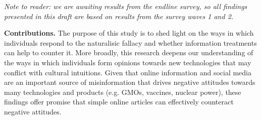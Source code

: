 \documentclass[12pt]{article}
\newcommand{\todo}[1]{\textit{\textcolor{red}{$<$todo$>$ #1 $<$/todo$>$}}}
\begin{document}
\textit{Note to reader: we are awaiting results from the endline survey, so all findings presented in this draft are based on results from the survey waves 1 and 2.}






\textbf{Contributions.} The purpose of this study is to shed light on the ways in which individuals respond to the naturalisic fallacy and whether information treatments can help to counter it. More broadly, this research deepens our understanding of the ways in which individuals form opinions towards new technologies that may conflict with cultural intuitions. Given that online information and social media are an important source of misinformation that drives negative attitudes towards many technologies and products (e.g. GMOs, vaccines, nuclear power), these findings offer promise that simple online articles can effectively counteract negative attitudes.
\end{document}
